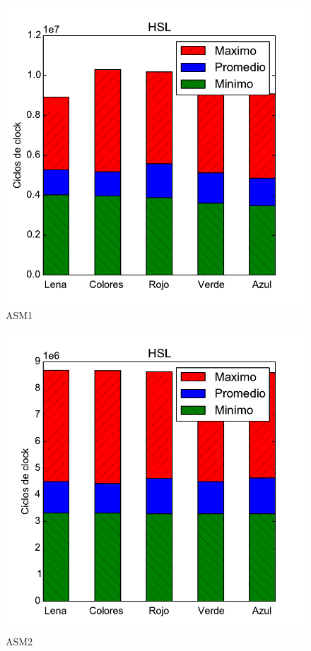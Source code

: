 \newpage
\begin{figure}[h!]
	\centering
	\includegraphics[scale=0.45]{images/hsl_comparationASM1}
	\caption{ASM1}
\end{figure}	

\begin{figure}[h!]
	\centering
	\includegraphics[scale=0.45]{images/hsl_comparationASM2}
	\caption{ASM2}
\end{figure}

